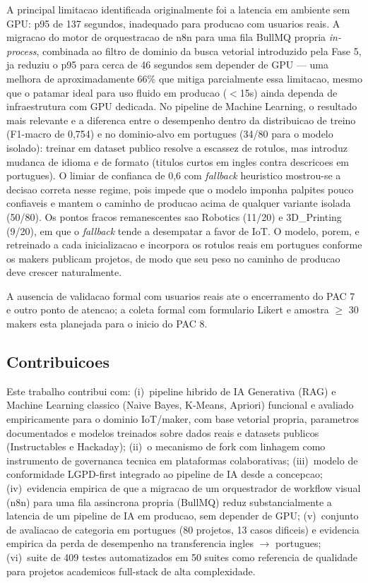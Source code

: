 \documentclass[portuguese]{sbcreviews-2025}%
\begin{document}
A principal limitacao identificada originalmente foi a latencia em ambiente sem GPU: p95 de 137 segundos, inadequado para producao com usuarios reais. A migracao do motor de orquestracao de n8n para uma fila BullMQ propria \textit{in-process}, combinada ao filtro de dominio da busca vetorial introduzido pela Fase 5, ja reduziu o p95 para cerca de 46 segundos sem depender de GPU --- uma melhora de aproximadamente 66\% que mitiga parcialmente essa limitacao, mesmo que o patamar ideal para uso fluido em producao ($<$15s) ainda dependa de infraestrutura com GPU dedicada. No pipeline de Machine Learning, o resultado mais relevante e a diferenca entre o desempenho dentro da distribuicao de treino (F1-macro de 0,754) e no dominio-alvo em portugues (34/80 para o modelo isolado): treinar em dataset publico resolve a escassez de rotulos, mas introduz mudanca de idioma e de formato (titulos curtos em ingles contra descricoes em portugues). O limiar de confianca de 0,6 com \textit{fallback} heuristico mostrou-se a decisao correta nesse regime, pois impede que o modelo imponha palpites pouco confiaveis e mantem o caminho de producao acima de qualquer variante isolada (50/80). Os pontos fracos remanescentes sao Robotics (11/20) e 3D\_Printing (9/20), em que o \textit{fallback} tende a desempatar a favor de IoT. O modelo, porem, e retreinado a cada inicializacao e incorpora os rotulos reais em portugues conforme os makers publicam projetos, de modo que seu peso no caminho de producao deve crescer naturalmente.

A ausencia de validacao formal com usuarios reais ate o encerramento do PAC 7 e outro ponto de atencao; a coleta formal com formulario Likert e amostra $\geq$ 30 makers esta planejada para o inicio do PAC 8.

\subsection{Contribuicoes}

Este trabalho contribui com: (i)~pipeline hibrido de IA Generativa (RAG) e Machine Learning classico (Naive Bayes, K-Means, Apriori) funcional e avaliado empiricamente para o dominio IoT/maker, com base vetorial propria, parametros documentados e modelos treinados sobre dados reais e datasets publicos (Instructables e Hackaday); (ii)~o mecanismo de fork com linhagem como instrumento de governanca tecnica em plataformas colaborativas; (iii)~modelo de conformidade LGPD-first integrado ao pipeline de IA desde a concepcao; (iv)~evidencia empirica de que a migracao de um orquestrador de workflow visual (n8n) para uma fila assincrona propria (BullMQ) reduz substancialmente a latencia de um pipeline de IA em producao, sem depender de GPU; (v)~conjunto de avaliacao de categoria em portugues (80 projetos, 13 casos dificeis) e evidencia empirica da perda de desempenho na transferencia ingles $\to$ portugues; (vi)~suite de 409 testes automatizados em 50 suites como referencia de qualidade para projetos academicos full-stack de alta complexidade.
\end{document}
